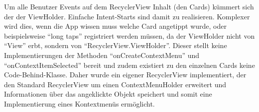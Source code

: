 Um alle Benutzer Events auf dem RecyclerView Inhalt (den Cards) kümmert sich der der ViewHolder. Einfache Intent-Starts sind damit zu realisieren. Komplexer wird dies, wenn die App wissen muss welche Card angetippt wurde, oder beispielsweise \enquote{long taps} registriert werden müssen, da der ViewHolder nicht von \enquote{View} erbt, sondern von \enquote{RecyclerView.ViewHolder}. Dieser stellt keine Implementierungen der Methoden \enquote{onCreateContextMenu} und \enquote{onContextItemSelected} bereit und zudem existiert zu den einzelnen Cards keine Code-Behind-Klasse. Daher wurde ein eigener RecyclerView implementiert, der den Standard RecyclerView um einen ContextMenuHolder erweitert und Informationen über das angeklickte Objekt speichert und somit eine Implementierung eines Kontextmenüs ermöglicht.
